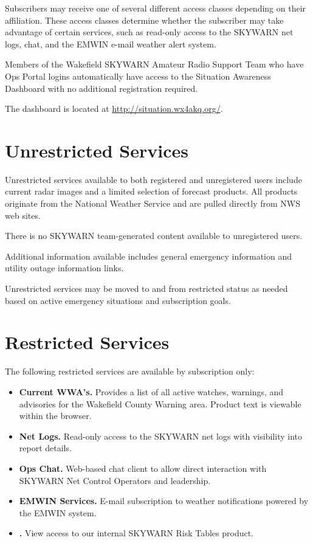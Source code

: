 \documentclass[pdflatex,letterpaper,twoside,12pt]{book}
\begin{document}
Subscribers may receive one of several different access classes depending on their affiliation.  These access classes determine whether the subscriber may take advantage of certain services, such as read-only access to the SKYWARN net logs, chat, and the EMWIN e-mail weather alert system.

Members of the Wakefield SKYWARN Amateur Radio Support Team who have Ops Portal logins automatically have access to the Situation Awareness Dashboard with no additional registration required.

The dashboard is located at \url{http://situation.wx4akq.org/}.


\section{Unrestricted Services}

Unrestricted services available to both registered and unregistered users include current radar images and a limited selection of forecast products.  All products originate from the National Weather Service and are pulled directly from NWS web sites.

There is no SKYWARN team-generated content available to unregistered users.

Additional information available includes general emergency information and utility outage information links.

Unrestricted services may be moved to and from restricted status as needed based on active emergency situations and subscription goals.


\section{Restricted Services}

The following restricted services are available by subscription only:

\begin{itemize}
\item {\bf Current WWA's.}  Provides a list of all active watches, warnings, and advisories for the Wakefield County Warning area.  Product text is viewable within the browser.
\item {\bf Net Logs.}  Read-only access to the SKYWARN net logs with visibility into report details.
\item {\bf Ops Chat.}  Web-based chat client to allow direct interaction with SKYWARN Net Control Operators and leadership.
\item {\bf EMWIN Services.}  E-mail subscription to weather notifications powered by the EMWIN system.
\item {\bf {}.}  View access to our internal SKYWARN Risk Tables product.
\end{itemize}
\end{document}
